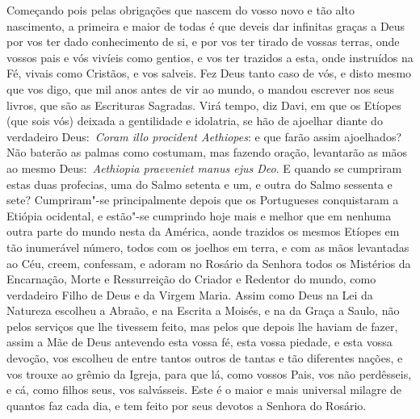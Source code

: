 Começando pois pelas obrigações que nascem do vosso novo e
tão alto nascimento, a primeira e maior de todas é que deveis dar
infinitas graças a Deus por vos ter dado conhecimento de si, e por vos
ter tirado de vossas terras, onde vossos pais e vós vivíeis como
gentios, e vos ter trazidos a esta, onde instruídos na Fé, vivais como
Cristãos, e vos salveis. Fez Deus tanto caso de vós, e disto mesmo que
vos digo, que mil anos antes de vir ao mundo, o mandou escrever nos seus
livros, que são as Escrituras Sagradas. Virá tempo, diz Davi, em que os
Etíopes (que sois vós) deixada a gentilidade e idolatria, se hão de
ajoelhar diante do verdadeiro Deus:~\emph{Coram illo procident
Aethiopes}: e que farão assim ajoelhados? Não baterão
as palmas como costumam, mas fazendo oração, levantarão as mãos ao mesmo
Deus:~\emph{Aethiopia praeveniet manus ejus Deo}. E
quando se cumpriram estas duas profecias, uma do Salmo setenta e um, e
outra do Salmo sessenta e sete? Cumpriram"-se principalmente depois que
os Portugueses conquistaram a Etiópia ocidental, e estão"-se cumprindo
hoje mais e melhor que em nenhuma outra parte do mundo nesta da América,
aonde trazidos os mesmos Etíopes em tão inumerável número, todos com os
joelhos em terra, e com as mãos levantadas ao Céu, creem, confessam, e
adoram no Rosário da Senhora todos os Mistérios da Encarnação, Morte e
Ressurreição do Criador e Redentor do mundo, como verdadeiro Filho de
Deus e da Virgem Maria. Assim como Deus na Lei da Natureza escolheu a
Abraão, e na Escrita a Moisés, e na da Graça a Saulo, não pelos serviços
que lhe tivessem feito, mas pelos que depois lhe haviam de fazer, assim
a Mãe de Deus antevendo esta vossa fé, esta vossa piedade, e esta vossa
devoção, vos escolheu de entre tantos outros de tantas e tão diferentes
nações, e vos trouxe ao grêmio da Igreja, para que lá, como vossos Pais,
vos não perdêsseis, e cá, como filhos seus, vos salvásseis. Este é o
maior e mais universal milagre de quantos faz cada dia, e tem feito por
seus devotos a Senhora do Rosário.


